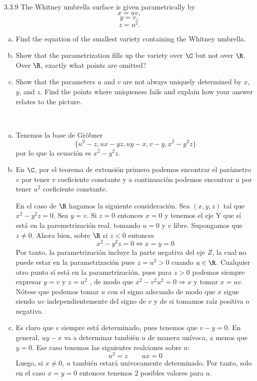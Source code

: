\documentclass[twoside]{article}
\begin{document}
\begin{ejercicio}{3.3.9}
The Whitney umbrella surface is given parametrically by
\[x = uv,\]
\[y = v,\]
\[z = u^2.\]
\begin{enumerate}[a.]
\item Find the equation of the smallest variety containing the Whitney umbrella.
\item Show that the parametrization fills up the variety over $\C$ but not over $\R$. Over $\R$,
exactly what points are omitted?
\item Show that the parameters $u$ and $v$ are not always uniquely determined by $x$, $y$, and $z$.
Find the points where uniqueness fails and explain how your answer relates to the
picture.
\end{enumerate}
\end{ejercicio}
\begin{solucion}\
\begin{enumerate}[a.]
\item Tenemos la base de Gröbner 
\[
\{u^2 - z, ux - yz, uy - x, v - y, x^2 - y^2z\}
\]
por lo que la ecuación es $x^2-y^2z$. 
\item En $\C$, por el teorema de extensión primero podemos encontrar el parámetro $v$ por tener $v$ coeficiente constante y a continuación podemos encontrar $u$ por tener $u^2$ coeficiente constante. 

En el caso de $\R$ hagamos la siguiente consideración. Sea $(x,y,z)$ tal que $x^2-y^2z=0$. Sea $y=v$. Si $z=0$ entonces $x=0$ y tenemos el eje Y que sí está en la paremetrización real, tomando $u=0$ y $v$ libre. Supongamos que $z\neq 0$. Ahora bien, sobre $\R$ si $z<0$ entonces 
$$x^2-y^2z = 0 \Leftrightarrow x= y =0$$
Por tanto, la parametrización incluye la parte negativa del eje $Z$, la cual no puede estar en la parametrización pues $z=u^2>0$ cuando $u\in\R$. Cualquier otro punto sí está en la parametrización, pues para $z>0$ podemos siempre expresar $y=v$ y $z=u^2$ , de modo que $x^2-v^2u^2=0\Rightarrow x$ y tomar $x=uv$. Nótese que podemos tomar $u$ con el signo adecuado de modo que $x$ sigue siendo $uv$ independientemente del signo de $v$ y de si tomamos raíz positiva o negativa. 

\item Es claro que $v$ siempre está determinado, pues tenemos que $v-y=0$. En general, $uy-x$ va a determinar también $u$ de manera unívoca, a menos que $y=0$. Ese caso tenemos las siguientes realciones sobre $u$:
$$
u^2 = z \qquad ux = 0
$$
Luego, si $x\neq 0$, $u$ también estará univocamente determinado. Por tanto, solo en el caso $x=y=0$ entonces tenemos 2 posibles valores para $u$.
\end{enumerate}
\end{solucion}
\end{document}
